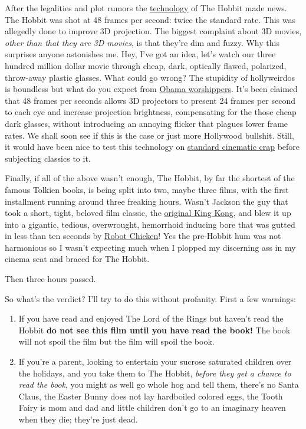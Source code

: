 After the legalities and plot rumors the
\href{http://www.pcmag.com/article2/0,2817,2403746,00.asp}{technology}
of The Hobbit made news. The Hobbit was shot at 48 frames per second:
twice the standard rate. This was allegedly done to improve 3D
projection. The biggest complaint about 3D movies, \emph{other than that
they are 3D movies}, is that they're dim and fuzzy. Why this surprises
anyone astonishes me. Hey, I've got an idea, let's watch our three
hundred million dollar movie through cheap, dark, optically flawed,
polarized, throw-away plastic glasses. What could go wrong? The
stupidity of hollyweirdos is boundless but what do you expect from
\href{http://www.huffingtonpost.com/2012/11/27/jamie-foxx-obama-lord-and-savior-furor-soul-train-awards\_n\_2199439.html}{Obama
worshippers}. It's been claimed that 48 frames per seconds allows 3D
projectors to present 24 frames per second to each eye and increase
projection brightness, compensating for the those cheap dark glasses,
without introducing an annoying flicker that plagues lower frame rates.
We shall soon see if this is the case or just more Hollywood bullshit.
Still, it would have been nice to test this technology on
\href{http://www.movieinsider.com/movies/worst/2012/}{standard cinematic
crap} before subjecting classics to it.

Finally, if all of the above wasn't enough, The Hobbit, by far the
shortest of the famous Tolkien books, is being split into two, maybe
three films, with the first installment running around three freaking
hours. Wasn't Jackson the guy that took a short, tight, beloved film
classic, the
\href{http://en.wikipedia.org/wiki/King\_Kong\_(1933\_film)}{original
King Kong}, and blew it up into a gigantic, tedious, overwrought,
hemorrhoid inducing bore that was gutted in less than ten seconds by
\href{http://video.adultswim.com/robot-chicken/just-the-good-parts.html}{Robot
Chicken}! Yes the pre-Hobbit hum was not harmonious so I wasn't
expecting much when I plopped my discerning ass in my cinema seat and
braced for The Hobbit.

\medskip
Then three hours passed.
\medskip

So what's the verdict? I'll try to do this without profanity. First a
few warnings:

\begin{enumerate}
\item
  If you have read and enjoyed The Lord of the Rings but haven't read
  the Hobbit \textbf{do not see this film until you have read the book!}
  The book will not spoil the film but the film will spoil the book.
\item
  If you're a parent, looking to entertain your sucrose saturated
  children over the holidays, and you take them to The Hobbit,
  \emph{before they get a chance to read the book}, you might as well go
  whole hog and tell them, there's no Santa Claus, the Easter Bunny does
  not lay hardboiled colored eggs, the Tooth Fairy is mom and dad and
  little children don't go to an imaginary heaven when they die; they're
  just dead.
\end{enumerate}

